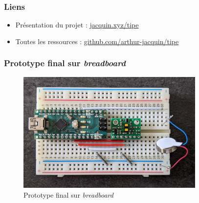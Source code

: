 \documentclass{beamer}
\begin{document}
\begin{frame}
\frametitle{Liens}
\begin{itemize}
\item Présentation du projet : \url{jacquin.xyz/tipe}
\item Toutes les ressources : \url{github.com/arthur-jacquin/tipe}
\end{itemize}
\end{frame}



\begin{frame}
\frametitle{Prototype final sur {\it breadboard}}
\begin{center}
\begin{figure}
\includegraphics[height=6cm]{images/prototype.jpg}
\caption{Prototype final sur {\it breadboard}}
\end{figure}
\end{center}
\end{frame}
\end{document}
